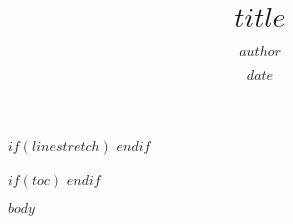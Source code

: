 \documentclass[$if(fontsize)$$fontsize$$else$11pt$endif$]{article}
\title{$title$}
\author{$author$}
\date{$date$}
\begin{document}
$if(linestretch)$
$endif$

\maketitle

$if(toc)$
{\let\cleardoublepage\relax\let\clearpage\relax\tableofcontents}
$endif$

$body$
\end{document}
